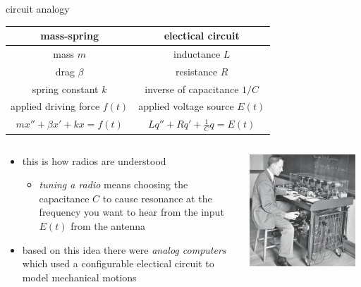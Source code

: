 \documentclass[dvipsnames,colorlinks]{beamer}
\begin{document}
\begin{frame}{circuit analogy}

\begin{tabular}{c|c}
mass-spring & electical circuit \\ \hline
mass $m$ & inductance $L$ \\
drag $\beta$ & resistance $R$ \\
spring constant $k$ & inverse of capacitance $1/C$ \\
applied driving force $f(t)$ & applied voltage source $E(t)$ \\
$mx''+\beta x'+k x = f(t)$ & $L q'' + R q' + \frac{1}{C} q=E(t)$
\end{tabular}

\bigskip
\begin{columns}
\begin{column}{0.7\textwidth}
\begin{itemize}
\item this is how radios are understood
    \begin{itemize}
    \item \emph{tuning a radio} means choosing the capacitance  $C$ to cause resonance at the frequency you want to hear from the input $E(t)$ from the antenna
    \end{itemize}
\item based on this idea there were \emph{analog computers} which used a configurable electical circuit to model mechanical motions
\end{itemize}
\end{column}
\begin{column}{0.4\textwidth}
\includegraphics[width=0.95\textwidth]{figs/nordsieck-analog-computer}
\end{column}
\end{columns}
\end{frame}
\end{document}
